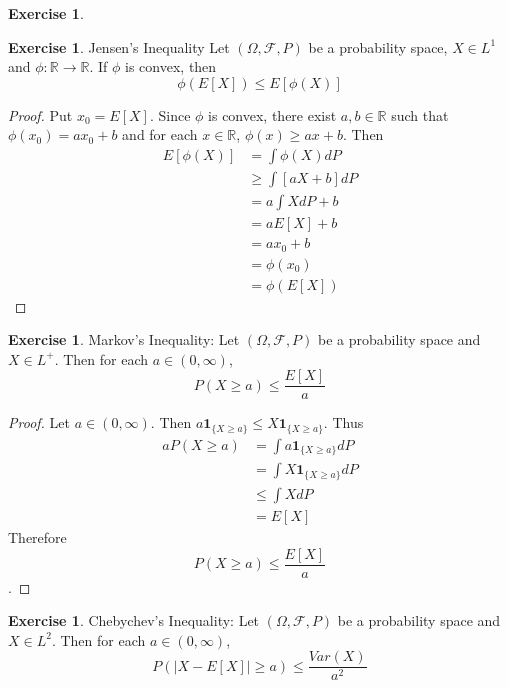\documentclass[12pt]{amsart}
\theoremstyle{definition}
\newtheorem{ex}[definition]{Exercise}
\newcommand{\Om}{\Omega}
\newcommand{\R}{\mathbb{R}}
\newcommand{\MF}{\mathcal{F}}
\begin{document}
	\begin{ex}
		
	\end{ex}
	
	\begin{ex}{Jensen's Inequality}
		Let $(\Om, \MF, P)$ be a probability space, $X \in L^1$ and $\phi:\R \rightarrow \R$. If $\phi$ is convex, then $$\phi(E[X]) \leq E[\phi(X)]$$
	\end{ex}
	
	\begin{proof}
		Put $x_0 = E[X]$. Since $\phi$ is convex, there exist $a,b \in \R$ such that $\phi(x_0) = ax_0+b$ and for each $x \in \R$, $\phi(x) \geq ax+b$. Then \begin{align*}
			E[\phi(X)] 
			&= \int\phi(X) dP \\
			&\geq \int[ aX+b ]dP \\
			&= a\int X dP +b \\
			&= aE[X] +b \\
			&= ax_0+b \\
			&= \phi(x_0) \\
			&= \phi(E[X])
		\end{align*}
	\end{proof}
	
	\begin{ex}{Markov's Inequality:}
		Let $(\Om, \MF, P)$ be a probability space and $X \in L^+$. Then for each $a \in (0,\infty)$, $$P(X \geq a) \leq \frac{E[X]}{a}$$
	\end{ex}
	
	\begin{proof}
		Let $a \in (0,\infty)$. Then $a \mathbf{1}_{\{X \geq a\}} \leq X \mathbf{1}_{\{X \geq a\}}$. Thus 
		\begin{align*}
			a P(X \geq a) 
			&= \int a \mathbf{1}_{\{X \geq a\}} dP\\
			&= \int X \mathbf{1}_{\{X \geq a\}} dP\\
			&\leq \int X dP \\
			&= E[X]
		\end{align*}
		Therefore $$P(X \geq a) \leq \frac{E[X]}{a}$$. 
	\end{proof}
	
	\begin{ex}{Chebychev's Inequality:}
		Let $(\Om, \MF, P)$ be a probability space and $X \in L^2$. Then for each $a \in (0, \infty)$, $$P(\vert X - E[X] \vert \geq a) \leq \frac{Var(X)}{a^2}$$
	\end{ex}
	
\end{document}
